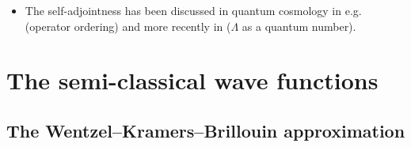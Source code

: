 \documentclass[8pt]{beamer}
\begin{document}
\begin{frame}
\begin{itemize}


\item The self-adjointness has been discussed in quantum cosmology in e.g.\
 (operator ordering) and more 
recently in  ($\Lambda$ as a quantum number).

\end{itemize}

\end{frame}










\section{The semi-classical wave functions}

\subsection{The Wentzel--Kramers--Brillouin approximation}
\end{document}
